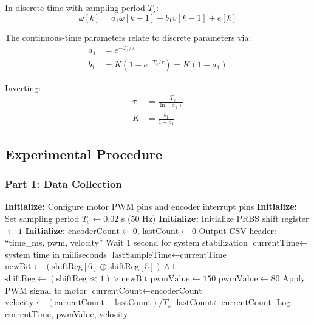 In discrete time with sampling period $T_s$:
\begin{equation}
\omega[k] = a_1 \omega[k-1] + b_1 v[k-1] + e[k]
\label{eq:motor_discrete}
\end{equation}

The continuous-time parameters relate to discrete parameters via:
\begin{align}
a_1 &= e^{-T_s/\tau} \\
b_1 &= K(1 - e^{-T_s/\tau}) = K(1 - a_1)
\end{align}

Inverting:
\begin{align}
\tau &= \frac{-T_s}{\ln(a_1)} \label{eq:tau_recovery}\\
K &= \frac{b_1}{1 - a_1} \label{eq:k_recovery}
\end{align}

\subsection{Experimental Procedure}

\subsubsection{Part 1: Data Collection}

\begin{algorithm}
\caption{Data Collection for System Identification}
\label{alg:sysid_data_collection}
\begin{algorithmic}[1]
\State \textbf{Initialize:} Configure motor PWM pins and encoder interrupt pins
\State \textbf{Initialize:} Set sampling period $T_s \gets 0.02$ s (50 Hz)
\State \textbf{Initialize:} Initialize PRBS shift register $\gets 1$
\State \textbf{Initialize:} $\text{encoderCount} \gets 0$, $\text{lastCount} \gets 0$
\State Output CSV header: ``time\_ms, pwm, velocity''
\State Wait 1 second for system stabilization
    \State $\text{currentTime} \gets$ system time in milliseconds
        \State $\text{lastSampleTime} \gets \text{currentTime}$
        \State {}
        \State $\text{newBit} \gets (\text{shiftReg}[6] \oplus \text{shiftReg}[5]) \land 1$
        \State $\text{shiftReg} \gets (\text{shiftReg} \ll 1) \lor \text{newBit}$
            \State $\text{pwmValue} \gets 150$ 
        \Else
            \State $\text{pwmValue} \gets 80$ 
        \EndIf
        \State Apply PWM signal to motor
        \State {}
        \State $\text{currentCount} \gets \text{encoderCount}$
        \State $\text{velocity} \gets (\text{currentCount} - \text{lastCount}) / T_s$
        \State $\text{lastCount} \gets \text{currentCount}$
        \State Log: currentTime, pwmValue, velocity
    \EndIf
\EndWhile
\end{algorithmic}
\end{algorithm}

